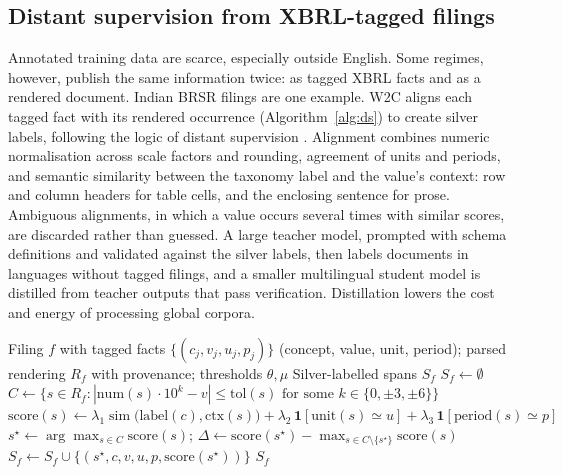 \documentclass{article}
\theoremstyle{plain}
\theoremstyle{definition}
\begin{document}
\subsection{Distant supervision from XBRL-tagged filings}
Annotated training data are scarce, especially outside English. Some regimes, however, publish the same information twice: as tagged XBRL facts and as a rendered document. Indian BRSR filings are one example. W2C aligns each tagged fact with its rendered occurrence (Algorithm~\ref{alg:ds}) to create silver labels, following the logic of distant supervision \citep{mintz2009distant}. Alignment combines numeric normalisation across scale factors and rounding, agreement of units and periods, and semantic similarity between the taxonomy label and the value's context: row and column headers for table cells, and the enclosing sentence for prose. Ambiguous alignments, in which a value occurs several times with similar scores, are discarded rather than guessed. A large teacher model, prompted with schema definitions and validated against the silver labels, then labels documents in languages without tagged filings, and a smaller multilingual student model is distilled \citep{hinton2015distilling} from teacher outputs that pass verification. Distillation lowers the cost and energy of processing global corpora.

\begin{algorithm}[t]
\caption{Distant supervision from XBRL-tagged filings}
\label{alg:ds}
\begin{algorithmic}[1]
\small
\Require Filing $f$ with tagged facts $\{(c_j, v_j, u_j, p_j)\}$ (concept, value, unit, period); parsed rendering $R_f$ with provenance; thresholds $\theta, \mu$
\Ensure Silver-labelled spans $S_f$
\State $S_f \gets \emptyset$
  \State $C \gets \{ s \in R_f : |\mathrm{num}(s)\cdot 10^{k} - v| \le \mathrm{tol}(s) \text{ for some } k \in \{0, \pm 3, \pm 6\}\}$
    \State $\mathrm{score}(s) \gets \lambda_1 \operatorname{sim}\big(\mathrm{label}(c), \mathrm{ctx}(s)\big) + \lambda_2\, \mathbf{1}[\mathrm{unit}(s) \simeq u] + \lambda_3\, \mathbf{1}[\mathrm{period}(s) \simeq p]$
  \EndFor
  \State $s^\star \gets \arg\max_{s \in C} \mathrm{score}(s)$; \quad $\Delta \gets \mathrm{score}(s^\star) - \max_{s \in C\setminus\{s^\star\}} \mathrm{score}(s)$
    \State $S_f \gets S_f \cup \{(s^\star, c, v, u, p, \mathrm{score}(s^\star))\}$ 
  \EndIf
\EndFor
\State \Return $S_f$
\end{algorithmic}
\end{algorithm}
\end{document}
